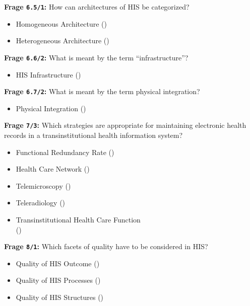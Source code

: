 \textbf{Frage \texttt{6.5/1}:} How can architectures of HIS be categorized?

\begin{itemize}
  \item Homogeneous Architecture ()
  \item Heterogeneous Architecture ()
\end{itemize}

\textbf{Frage \texttt{6.6/2}:} What is meant by the term \enquote{infrastructure}?

\begin{itemize}
  \item HIS Infrastructure ()
\end{itemize}

\textbf{Frage \texttt{6.7/2}:} What is meant by the term physical integration?

\begin{itemize}
  \item Physical Integration ()
\end{itemize}

\textbf{Frage \texttt{7/3}:} Which strategies are appropriate for maintaining electronic health records in a transinstitutional health information system?

\begin{itemize}
  \item Functional Redundancy Rate ()
  \item Health Care Network ()
  \item Telemicroscopy ()
  \item Teleradiology ()
  \item Transinstitutional Health Care Function \\
  ()
\end{itemize}

\textbf{Frage \texttt{8/1}:} Which facets of quality have to be considered in HIS?

\begin{itemize}
  \item Quality of HIS Outcome ()
  \item Quality of HIS Processes ()
  \item Quality of HIS Structures ()
\end{itemize}

